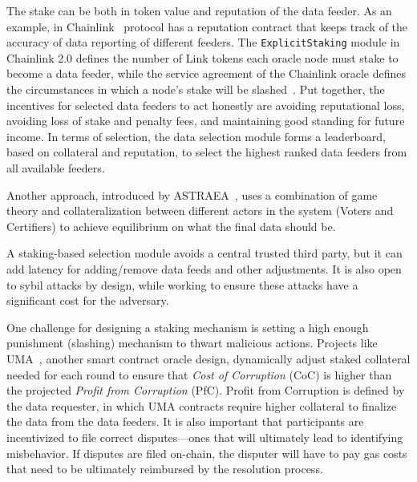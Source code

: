 The stake can be both in token value and reputation of the data feeder. As an example, in Chainlink~\cite{ellis2017chainlink} protocol has a reputation contract that keeps track of the accuracy of data reporting of different feeders. The \texttt{ExplicitStaking} module in Chainlink 2.0 defines the number of Link tokens each oracle node must stake to become a data feeder, while the service agreement of the Chainlink oracle defines the circumstances in which a node's stake will be slashed~\cite{chainlinkExplicitStaking}. Put together, the incentives for selected data feeders to act honestly are avoiding reputational loss, avoiding loss of stake and penalty fees, and maintaining good standing for future income. In terms of selection, the data selection module forms a leaderboard, based on collateral and reputation, to select the highest ranked data feeders from all available feeders.

Another approach, introduced by ASTRAEA~\cite{adler2018astraea}, uses a combination of game theory and collateralization between different actors in the system (Voters and Certifiers) to achieve equilibrium on what the final data should be. 

A staking-based selection module avoids a central trusted third party, but it can add latency for adding/remove data feeds and other adjustments. It is also open to sybil attacks by design, while working to ensure these attacks have a significant cost for the adversary. 

One challenge for designing a staking mechanism is setting a high enough punishment (slashing) mechanism to thwart malicious actions. Projects like UMA~\cite{umawhitepaper}, another smart contract oracle design, dynamically adjust staked collateral needed for each round to ensure that \textit{Cost of Corruption} (CoC) is higher than the projected \textit{Profit from Corruption} (PfC). Profit from Corruption is defined by the data requester, in which UMA contracts require higher collateral to finalize the data from the data feeders. It is also important that participants are incentivized to file correct disputes---ones that will ultimately lead to identifying misbehavior. If disputes are filed on-chain, the disputer will have to pay gas costs that need to be ultimately reimbursed by the resolution process. 


